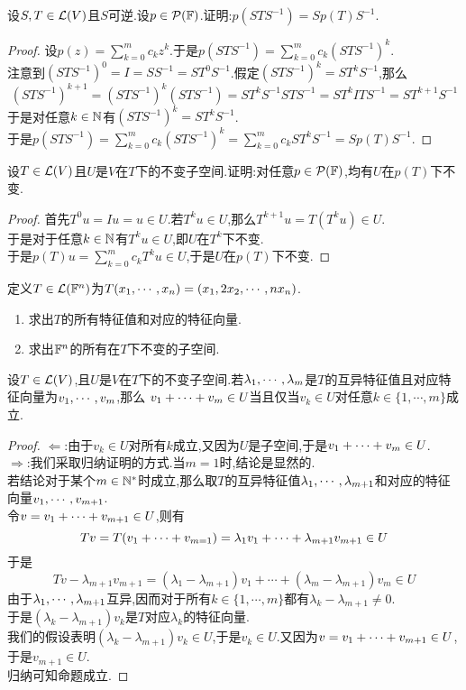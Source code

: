 \documentclass{ctexart}
\begin{document}
\begin{problem}[40.]
    设$S,T\in\mathcal{L}(V)$且$S$可逆.设$p\in\mathcal{P}(\mathbb{F})$.证明:$p(STS^{-1})=Sp(T)S^{-1}$.
\end{problem}
\begin{proof}
    设$p(z)=\displaystyle\sum_{k=0}^{m}c_kz^k$.于是$\displaystyle p(STS^{-1})=\sum_{k=0}^{m}c_k(STS^{-1})^k$.\\
    注意到$(STS^{-1})^{0}=I=SS^{-1}=ST^0S^{-1}$.假定$(STS^{-1})^k=ST^kS^{-1}$,那么
    $$(STS^{-1})^{k+1}=(STS^{-1})^k(STS^{-1})=ST^{k}S^{-1}STS^{-1}=ST^{k}ITS^{-1}=ST^{k+1}S^{-1}$$
    于是对任意$k\in\mathbb{N}$有$(STS^{-1})^k=ST^kS^{-1}$.\\
    于是$\displaystyle p(STS^{-1})=\sum_{k=0}^{m}c_k(STS^{-1})^k=\sum_{k=0}^mc_kST^{k}S^{-1}=Sp(T)S^{-1}$.
\end{proof}
\begin{problem}[41.]
    设$T\in\mathcal{L}(V)$且$U$是$V$在$T$下的不变子空间.证明:对任意$p\in\mathcal{P}(\mathbb{F})$,均有$U$在$p(T)$下不变.
\end{problem}
\begin{proof}
    首先$T^0u=Iu=u\in U$.若$T^ku\in U$,那么$T^{k+1}u=T(T^k u)\in U$.\\
    于是对于任意$k\in\mathbb{N}$有$T^ku\in U$,即$U$在$T^k$下不变.\\
    于是$\displaystyle p(T)u=\sum_{k=0}^{m}c_kT^ku\in U$,于是$U$在$p(T)$下不变.
\end{proof}
\begin{problem}[42.]
    定义$T\in\mathcal{L}(\mathbb{F}^n)$为$T({x}_1,\cdots,{x}_{n})=(x_1,2x_2,\cdots,nx_n)$.
    \begin{enumerate}[label=\tbf{(\arabic*)}]
        \item 求出$T$的所有特征值和对应的特征向量.
        \item 求出$\mathbb{F}^n$的所有在$T$下不变的子空间.
    \end{enumerate}
\end{problem}
\begin{lemma}[Lemma.L.4]
    设$T\in\mathcal{L}(V)$,且$U$是$V$在$T$下的不变子空间.若${\lambda}_1,\cdots,{\lambda}_{m}$是$T$的互异特征值且对应特征向量为${v}_1,\cdots,{v}_{m}$,那么%
    ${v}_1+\cdots+{v}_{m}\in U$当且仅当$v_k\in U$对任意$k\in\{1,\cdots,m\}$成立.
\end{lemma}
\begin{proof}
    $\Leftarrow$:由于$v_k\in U$对所有$k$成立,又因为$U$是子空间,于是${v}_1+\cdots+{v}_{m}\in U$.\\
    $\Rightarrow$:我们采取归纳证明的方式.当$m=1$时,结论是显然的.\\
    若结论对于某个$m\in\mathbb{N}^*$时成立,那么取$T$的互异特征值${\lambda}_1,\cdots,{\lambda}_{m+1}$和对应的特征向量${v}_1,\cdots,{v}_{m+1}$.\\
    令$v={v}_1+\cdots+{v}_{m+1}\in U$,则有
    \[Tv=T({v}_1+\cdots+{v}_{m=1})=\lambda_1v_1+\cdots+\lambda_{m+1}v_{m+1}\in U\]
    于是
    \[Tv-\lambda_{m+1}v_{m+1}=(\lambda_1-\lambda_{m+1})v_1+\cdots+(\lambda_m-\lambda_{m+1})v_m\in U\]
    由于${\lambda}_1,\cdots,{\lambda}_{m+1}$互异,因而对于所有$k\in\{1,\cdots,m\}$都有$\lambda_k-\lambda_{m+1}\neq0$.\\
    于是$(\lambda_k-\lambda_{m+1})v_k$是$T$对应$\lambda_k$的特征向量.\\
    我们的假设表明$(\lambda_k-\lambda_{m+1})v_k\in U$,于是$v_k\in U$.又因为$v={v}_1+\cdots+{v}_{m+1}\in U$,于是$v_{m+1}\in U$.\\
    归纳可知命题成立.
\end{proof}
\end{document}
